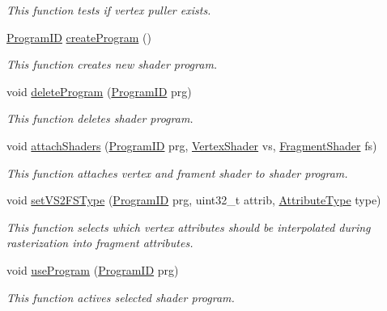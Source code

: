 \begin{DoxyCompactItemize}
\begin{DoxyCompactList}\small\item\em This function tests if vertex puller exists. \end{DoxyCompactList}\item 
\hyperlink{fwd_8hpp_a46ffd067c21ab50f5f1fcfed5d8bfc15}{Program\+ID} \hyperlink{group__program__tasks_gae1368a616ba5be607b9cf4dd1e60dfe0}{create\+Program} ()
\begin{DoxyCompactList}\small\item\em This function creates new shader program. \end{DoxyCompactList}\item 
void \hyperlink{group__program__tasks_ga3f8363f9c27c3f900f258e6acee52683}{delete\+Program} (\hyperlink{fwd_8hpp_a46ffd067c21ab50f5f1fcfed5d8bfc15}{Program\+ID} prg)
\begin{DoxyCompactList}\small\item\em This function deletes shader program. \end{DoxyCompactList}\item 
void \hyperlink{group__program__tasks_gafe72b55028369d1e9e9f8d087c76af09}{attach\+Shaders} (\hyperlink{fwd_8hpp_a46ffd067c21ab50f5f1fcfed5d8bfc15}{Program\+ID} prg, \hyperlink{fwd_8hpp_af647cdb302d7e978c6a0da41a0a92725}{Vertex\+Shader} vs, \hyperlink{fwd_8hpp_a52f1704ae0b129e49fe1902e05319ad6}{Fragment\+Shader} fs)
\begin{DoxyCompactList}\small\item\em This function attaches vertex and frament shader to shader program. \end{DoxyCompactList}\item 
void \hyperlink{group__program__tasks_gaff499d4f692ea0dd7125bfd324957619}{set\+V\+S2\+F\+S\+Type} (\hyperlink{fwd_8hpp_a46ffd067c21ab50f5f1fcfed5d8bfc15}{Program\+ID} prg, uint32\+\_\+t attrib, \hyperlink{fwd_8hpp_a349a9cde14be8097df865ba0469c0ab2}{Attribute\+Type} type)
\begin{DoxyCompactList}\small\item\em This function selects which vertex attributes should be interpolated during rasterization into fragment attributes. \end{DoxyCompactList}\item 
void \hyperlink{group__program__tasks_ga4f2bd468b0ef5fed61ffa34314319a20}{use\+Program} (\hyperlink{fwd_8hpp_a46ffd067c21ab50f5f1fcfed5d8bfc15}{Program\+ID} prg)
\begin{DoxyCompactList}\small\item\em This function actives selected shader program. \end{DoxyCompactList}\item 

\end{DoxyCompactItemize}
